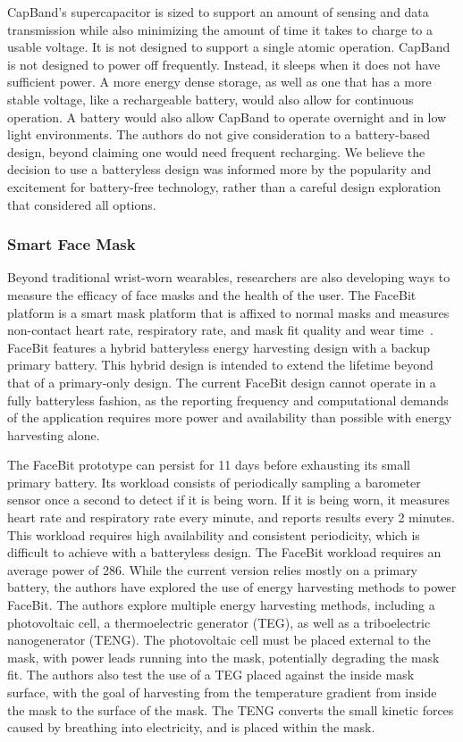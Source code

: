 CapBand's supercapacitor is sized to support an amount of sensing and data transmission while also minimizing the amount of time it takes to charge to a usable voltage. It is not designed to support a single atomic operation. CapBand is not designed to power off frequently. Instead, it sleeps when it does not have sufficient power.
A more energy dense storage, as well as one that has a more stable voltage, like a rechargeable battery, would also allow for continuous operation. A battery would also allow CapBand to operate overnight and in low light environments. 
The authors do not give consideration to a battery-based design, beyond claiming one would need frequent recharging.
We believe the decision to use a batteryless design was informed more by the popularity and excitement for battery-free technology, rather than a careful design exploration that considered all options. 

\subsubsection{Smart Face Mask}
Beyond traditional wrist-worn wearables, researchers are also developing ways to measure the efficacy of face masks and the health of the user.
The FaceBit platform is a smart mask platform that is affixed to normal masks and measures non-contact heart rate, respiratory rate, and mask fit quality and wear time~\cite{curtiss2021facebit}.
FaceBit features a hybrid batteryless energy harvesting design with a backup primary battery. This hybrid design is intended to extend the lifetime beyond that of a primary-only design.
The current FaceBit design cannot operate in a fully batteryless fashion, as the reporting frequency and computational demands of the application requires more power and availability than possible with energy harvesting alone.

The FaceBit prototype can persist for 11 days before exhausting its small primary battery.
Its workload consists of periodically sampling a barometer sensor once a second to detect if it is being worn. If it is being worn, it measures  heart rate and respiratory rate every minute, and reports results every 2 minutes.
This workload requires high availability and consistent periodicity, which is difficult to achieve with a batteryless design. 
The FaceBit workload requires an average power of 286\ssi{\micro\watt}.
While the current version relies mostly on a primary battery, the authors have explored the use of energy harvesting methods to power FaceBit. 
The authors explore multiple energy harvesting methods, including a photovoltaic cell, a thermoelectric generator (TEG), as well as a triboelectric nanogenerator (TENG).
The photovoltaic cell must be placed external to the mask, with power leads running into the mask, potentially degrading the mask fit.
The authors also test the use of a TEG placed against the inside mask surface, with the goal of harvesting from the temperature gradient from inside the mask to the surface of the mask. 
The TENG converts the small kinetic forces caused by breathing into electricity, and is placed within the mask.

